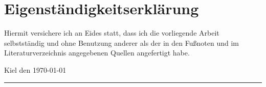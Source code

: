 \section*{Eigenständigkeitserklärung}
Hiermit versichere ich an Eides statt, dass ich die vorliegende Arbeit selbstständig und ohne Benutzung anderer als der in den Fußnoten und im Literaturverzeichnis angegebenen Quellen angefertigt habe.

Kiel den \today

\vspace{1cm} %

\rule{6cm}{1pt} %
\\ %
\me %